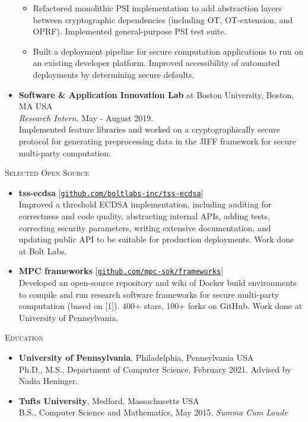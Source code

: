 \documentclass{article}
\begin{document}
\begin{itemize}[label={}]
\begin{itemize}[leftmargin=*, noitemsep, topsep=0pt, partopsep=0pt]
    \item Refactored monolithic PSI implementation to add abstraction layers between cryptographic dependencies (including OT, OT-extension, and OPRF). Implemented general-purpose PSI test suite.
    \item Built a deployment pipeline for secure computation applications to run on an existing developer platform. Improved accessibility of automated deployments by determining secure defaults.
  \end{itemize}
  \item \textbf{Software \& Application Innovation Lab} at Boston University, Boston, MA USA\\
  \textit{Research Intern.} May - August 2019.\\
  Implemented feature libraries and worked on a cryptographically secure protocol for generating preprocessing data in the JIFF framework for secure multi-party computation.
\end{itemize}

\textsc{Selected Open Source} \hrulefill
\begin{itemize}[label={}]
  \item \textbf{tss-ecdsa} [\href{https://github.com/boltlabs-inc/tss-ecdsa}{\texttt{github.com/boltlabs-inc/tss-ecdsa}}]\\
  Improved a threshold ECDSA implementation, including auditing for correctness and code quality, abstracting internal APIs, adding tests, correcting security parameters, writing extensive documentation, and updating public API to be suitable for production deployments. Work done at Bolt Labs.
  \item \textbf{MPC frameworks} [\href{https://github.com/mpc-sok/frameworks}{\texttt{github.com/mpc-sok/frameworks}}]\\
  Developed an open-source repository and wiki of Docker build environments to compile and run research software frameworks for secure multi-party computation (based on [1]). 400+ stars, 100+ forks on GitHub. Work done at University of Pennsylvania.
\end{itemize}

\textsc{Education} \hrulefill
\begin{itemize}[label={}]
  \item \textbf{University of Pennsylvania}, Philadelphia, Pennsylvania USA \\
    Ph.D., M.S., Department of Computer Science, February 2021. Advised by Nadia Heninger.
    
  \item \textbf{Tufts University}, Medford, Massachusetts USA \\
    B.S., Computer Science and Mathematics, May 2015. \textit{Summa Cum Laude}
\end{itemize}
\end{document}
